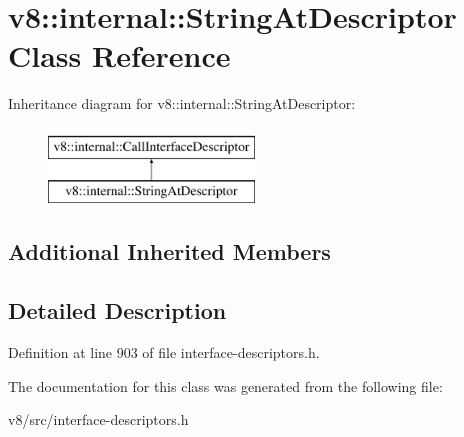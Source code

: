 \hypertarget{classv8_1_1internal_1_1StringAtDescriptor}{}\section{v8\+:\+:internal\+:\+:String\+At\+Descriptor Class Reference}
\label{classv8_1_1internal_1_1StringAtDescriptor}
Inheritance diagram for v8\+:\+:internal\+:\+:String\+At\+Descriptor\+:\begin{figure}[H]
\begin{center}
\leavevmode
\includegraphics[height=2.000000cm]{classv8_1_1internal_1_1StringAtDescriptor}
\end{center}
\end{figure}
\subsection*{Additional Inherited Members}


\subsection{Detailed Description}


Definition at line 903 of file interface-\/descriptors.\+h.



The documentation for this class was generated from the following file\+:\begin{DoxyCompactItemize}
\item 
v8/src/interface-\/descriptors.\+h\end{DoxyCompactItemize}
